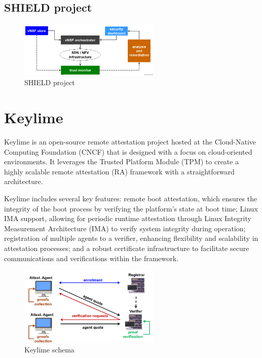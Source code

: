 \subsection{SHIELD project}

\begin{figure}[H]
  \centering
  \includegraphics[width=0.6\textwidth]{img/SHIELD project.png}
  \caption{SHIELD project}
\end{figure}

\section{Keylime}

Keylime is an open-source remote attestation project hosted at the
Cloud-Native Computing Foundation (CNCF) that is designed with a focus
on cloud-oriented environments. It leverages the Trusted Platform
Module (TPM) to create a highly scalable remote attestation (RA)
framework with a straightforward architecture.

Keylime includes several key features: remote boot attestation, which
ensures the integrity of the boot process by verifying the platform's
state at boot time; Linux IMA support, allowing for periodic runtime
attestation through Linux Integrity Measurement Architecture (IMA) to
verify system integrity during operation; registration of multiple
agents to a verifier, enhancing flexibility and scalability in
attestation processes; and a robust certificate infrastructure to
facilitate secure communications and verifications within the
framework.

\begin{figure}[H]
  \centering
  \includegraphics[width=0.6\textwidth]{img/keylime schema.png}
  \caption{Keylime schema}
\end{figure}

